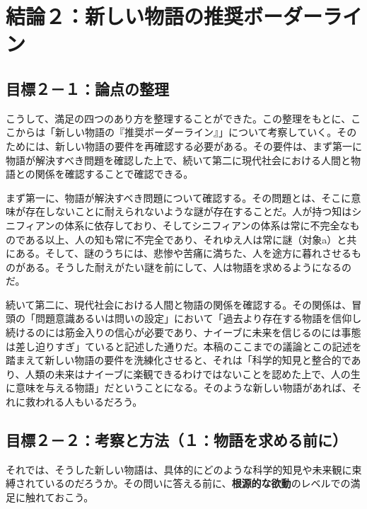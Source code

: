 \section{結論２：新しい物語の推奨ボーダーライン}\label{ux7d50ux8ad6uxff12ux65b0ux3057ux3044ux7269ux8a9eux306eux63a8ux5968ux30dcux30fcux30c0ux30fcux30e9ux30a4ux30f3}

\subsection{目標２－１：論点の整理}\label{ux76eeux6a19uxff12uxff11ux8ad6ux70b9ux306eux6574ux7406}

こうして、満足の四つのあり方を整理することができた。この整理をもとに、ここからは「新しい物語の『推奨ボーダーライン』」について考察していく。そのためには、新しい物語の要件を再確認する必要がある。その要件は、まず第一に物語が解決すべき問題を確認した上で、続いて第二に現代社会における人間と物語との関係を確認することで確認できる。

まず第一に、物語が解決すべき問題について確認する。その問題とは、そこに意味が存在しないことに耐えられないような謎が存在することだ。人が持つ知はシニフィアンの体系に依存しており、そしてシニフィアンの体系は常に不完全なものである以上、人の知も常に不完全であり、それゆえ人は常に謎（対象a）と共にある。そして、謎のうちには、悲惨や苦痛に満ちた、人を途方に暮れさせるものがある。そうした耐えがたい謎を前にして、人は物語を求めるようになるのだ。

続いて第二に、現代社会における人間と物語の関係を確認する。その関係は、冒頭の「問題意識あるいは問いの設定」において「過去より存在する物語を信仰し続けるのには筋金入りの信心が必要であり、ナイーブに未来を信じるのには事態は差し迫りすぎ」ていると記述した通りだ。本稿のここまでの議論とこの記述を踏まえて新しい物語の要件を洗練化させると、それは「科学的知見と整合的であり、人類の未来はナイーブに楽観できるわけではないことを認めた上で、人の生に意味を与える物語」だということになる。そのような新しい物語があれば、それに救われる人もいるだろう。

\subsection{目標２－２：考察と方法（１：物語を求める前に）}\label{ux76eeux6a19uxff12uxff12ux8003ux5bdfux3068ux65b9ux6cd5uxff11ux7269ux8a9eux3092ux6c42ux3081ux308bux524dux306b}

それでは、そうした新しい物語は、具体的にどのような科学的知見や未来観に束縛されているのだろうか。その問いに答える前に、\textbf{根源的な欲動}のレベルでの満足に触れておこう。


